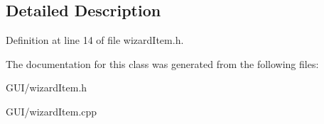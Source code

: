\subsection{Detailed Description}


Definition at line 14 of file wizard\+Item.\+h.



The documentation for this class was generated from the following files\+:\begin{DoxyCompactItemize}
\item 
G\+U\+I/wizard\+Item.\+h\item 
G\+U\+I/wizard\+Item.\+cpp\end{DoxyCompactItemize}

